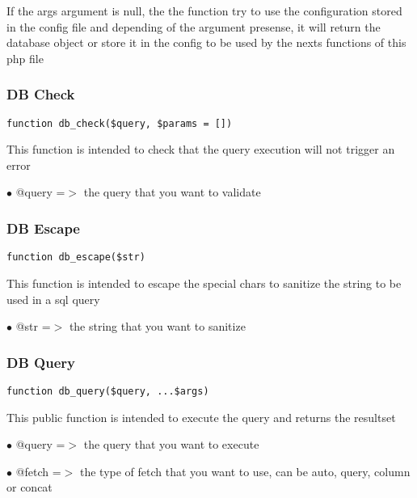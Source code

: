 \documentclass[a4paper]{article}
\begin{document}
If the args argument is null, the the function try to use the configuration stored in the config file
and depending of the argument presense, it will return the database object or store it in the config
to be used by the nexts functions of this php file

\hypertarget{toc86}{}
\subsubsection{DB Check}

\begin{lstlisting}
function db_check($query, $params = [])
\end{lstlisting}

This function is intended to check that the query execution will not trigger an error

\begin{compactitem}
\item[\color{myblue}$\bullet$] @query =$>$ the query that you want to validate
\end{compactitem}

\hypertarget{toc87}{}
\subsubsection{DB Escape}

\begin{lstlisting}
function db_escape($str)
\end{lstlisting}

This function is intended to escape the special chars to sanitize the string to be used
in a sql query

\begin{compactitem}
\item[\color{myblue}$\bullet$] @str =$>$ the string that you want to sanitize
\end{compactitem}

\hypertarget{toc88}{}
\subsubsection{DB Query}

\begin{lstlisting}
function db_query($query, ...$args)
\end{lstlisting}

This public function is intended to execute the query and returns the resultset

\begin{compactitem}
\item[\color{myblue}$\bullet$] @query =$>$ the query that you want to execute
\item[\color{myblue}$\bullet$] @fetch =$>$ the type of fetch that you want to use, can be auto, query, column or concat
\end{compactitem}
\end{document}
